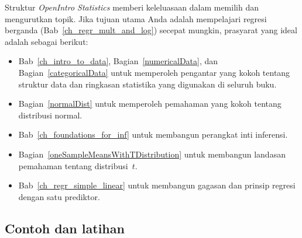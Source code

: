 \noindent%
Struktur \emph{OpenIntro Statistics} memberi keleluasaan
dalam memilih dan mengurutkan topik.
Jika tujuan utama Anda adalah mempelajari regresi berganda
(Bab~\ref{ch_regr_mult_and_log})
secepat mungkin, prasyarat yang ideal adalah sebagai berikut:
\begin{itemize}
\setlength{\itemsep}{0mm}
\item Bab~\ref{ch_intro_to_data},
    Bagian~\ref{numericalData},
    dan Bagian~\ref{categoricalData} untuk memperoleh
    pengantar yang kokoh tentang struktur data dan ringkasan
    statistika yang digunakan di seluruh buku.
\item Bagian~\ref{normalDist}
    untuk memperoleh pemahaman yang kokoh tentang distribusi normal.
\item Bab~\ref{ch_foundations_for_inf}
    untuk membangun perangkat inti inferensi.
%    
%    
\item Bagian~\ref{oneSampleMeansWithTDistribution}
    untuk membangun landasan pemahaman tentang distribusi~$t$.
\item Bab~\ref{ch_regr_simple_linear}
    untuk membangun gagasan dan prinsip regresi
    dengan satu prediktor.
\end{itemize}


\subsection*{{\color{oiB}Contoh dan latihan}}

